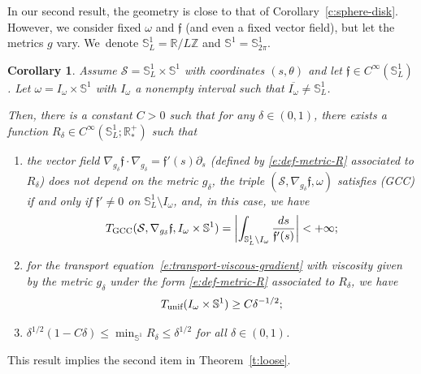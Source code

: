 \documentclass[10pt]{amsart}
\newcommand{\GCC}{\textup{GCC}}
\newcommand{\pGCC}{\textup{(GCC)}\xspace}
\newcommand{\unif}{\textup{unif}}
\newtheorem{corollary}[lemma]{Corollary}
\theoremstyle{definition}
\newcommand{\calS}{\ensuremath{\mathcal S}}
\newcommand{\mb}[1]{\ensuremath{\mathbb{#1}}}
\newcommand{\R}{{\mb{R}}}
\newcommand{\bS}{\ensuremath{\mathbb S}}
\newcommand{\Z}{\mathbb Z}
\newcommand{\f}{\ensuremath{\mathfrak{f}}}
\let\d\partial
\let\ovl\overline
\begin{document}
In our second result, the geometry is close to that of Corollary~\ref{c:sphere-disk}. However, we consider fixed $\omega$ and $\f$ (and even a fixed vector field), but let the metrics $g$ vary.
We~denote $\bS^1_L = \R/L\Z$ and $\bS^1 =\bS^1_{2\pi}$.
\begin{corollary}
\label{c:example-torus}
Assume $\calS=\bS^1_L \times \bS^1$ with coordinates $(s,\theta)$ and let $\f\in C^{\infty}(\bS^1_L)$.
Let $\omega = I_\omega \times \bS^1$ with $I_\omega$ a nonempty interval such that $\ovl{I_\omega} \neq \bS^1_L$.

Then, there is a constant $C>0$ such that for any $\delta \in (0,1)$, there exists a function $R_\delta \in C^\infty(\bS^1_L ;\R^+_*)$ such that
\begin{enumerate}
\item the vector field $\nabla_{g_\delta}\f \cdot \nabla_{g_\delta}= \f'(s) \d_s$ (defined by \eqref{e:def-metric-R} associated to $R_\delta$) does not depend on the metric $g_\delta$, the triple $(\calS,\nabla_{g_\delta}\f,\omega)$ satisfies \pGCC if and only if $\f'\neq 0$ on $\bS^1_L \setminus I_\omega$, and, in this case, we have\vspace*{-3pt}
\[
T_{\GCC}(\calS, \nabla_{g_\delta}\f,I_\omega \times \bS^1) = \biggl| \int_{\bS^1_L \setminus I_\omega} \frac{ds}{\f'(s)} \biggr| < +\infty;
\]
\item for the transport equation~\eqref{e:transport-viscous-gradient} with viscosity given by the metric $g_\delta$ under the form \eqref{e:def-metric-R} associated to $R_\delta$, we have\vspace*{-3pt}
\[
T_{\unif}(I_\omega \times\bS^1) \geq C\delta^{-1/2};
\]
\item $\delta^{1/2} (1-C\delta) \leq \min_{\bS^1}R_\delta \leq \delta^{1/2}$ for all $\delta \in (0,1)$.
\end{enumerate}
\end{corollary}
This result implies the second item in Theorem~\ref{t:loose}.
\end{document}
